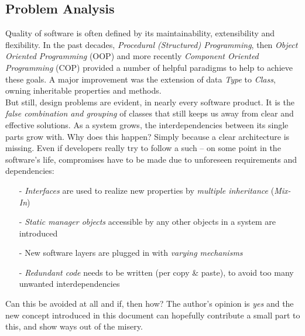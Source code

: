 %
%
%
%
%
%
%

\subsection{Problem Analysis}
\label{problem_analysis_heading}

Quality of software is often defined by its maintainability, extensibility and
flexibility. In the past decades, \emph{Procedural (Structured) Programming},
then \emph{Object Oriented Programming} (OOP) and more recently \emph{Component
Oriented Programming} (COP) provided a number of helpful paradigms to help to
achieve these goals. A major improvement was the extension of data \emph{Type}
to \emph{Class}, owning inheritable properties and methods.\\
But still, design problems are evident, in nearly every software product.
It is the \emph{false combination and grouping} of classes that still keeps us
away from clear and effective solutions. As a system grows, the interdependencies
between its single parts grow with. Why does this happen? Simply because a clear
architecture is missing. Even if developers really try to follow a such --
on some point in the software's life, compromises have to be made due to
unforeseen requirements and dependencies:
\begin{itemize}
    \item[-] \emph{Interfaces} are used to realize new properties by
        \emph{multiple inheritance} (\emph{Mix-In})
    \item[-] \emph{Static manager objects} accessible by any other objects in a
        system are introduced
    \item[-] New software layers are plugged in with \emph{varying mechanisms}
    \item[-] \emph{Redundant code} needs to be written (per copy \& paste),
        to avoid too many unwanted interdependencies
\end{itemize}

Can this be avoided at all and if, then how? The author's opinion is \emph{yes}
and the new concept introduced in this document can hopefully contribute a small
part to this, and show ways out of the misery.

